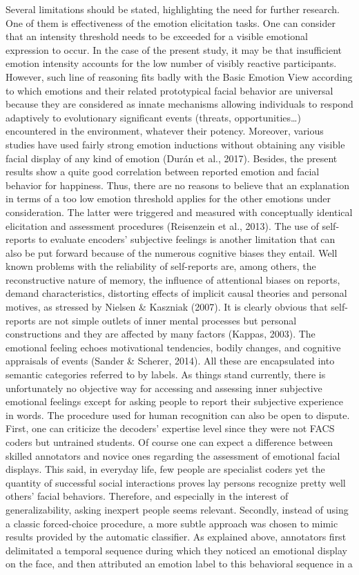 \documentclass[man]{apa6}
\begin{document}
Several limitations should be stated, highlighting the need for further research. One of them is effectiveness of the emotion elicitation tasks. One can consider that an intensity threshold needs to be exceeded for a visible emotional expression to occur. In the case of the present study, it may be that insufficient emotion intensity accounts for the low number of visibly reactive participants. However, such line of reasoning fits badly with the Basic Emotion View according to which emotions and their related prototypical facial behavior are universal because they are considered as innate mechanisms allowing individuals to respond adaptively to evolutionary significant events (threats, opportunities\ldots{}) encountered in the environment, whatever their potency. Moreover, various studies have used fairly strong emotion inductions without obtaining any visible facial display of any kind of emotion (Durán et al., 2017). Besides, the present results show a quite good correlation between reported emotion and facial behavior for happiness. Thus, there are no reasons to believe that an explanation in terms of a too low emotion threshold applies for the other emotions under consideration. The latter were triggered and measured with conceptually identical elicitation and assessment procedures (Reisenzein et al., 2013). The use of self-reports to evaluate encoders' subjective feelings is another limitation that can also be put forward because of the numerous cognitive biases they entail. Well known problems with the reliability of self-reports are, among others, the reconstructive nature of memory, the influence of attentional biases on reports, demand characteristics, distorting effects of implicit causal theories and personal motives, as stressed by Nielsen \& Kaszniak (2007). It is clearly obvious that self-reports are not simple outlets of inner mental processes but personal constructions and they are affected by many factors (Kappas, 2003). The emotional feeling echoes motivational tendencies, bodily changes, and cognitive appraisals of events (Sander \& Scherer, 2014). All these are encapsulated into semantic categories referred to by labels. As things stand currently, there is unfortunately no objective way for accessing and assessing inner subjective emotional feelings except for asking people to report their subjective experience in words. The procedure used for human recognition can also be open to dispute. First, one can criticize the decoders' expertise level since they were not FACS coders but untrained students. Of course one can expect a difference between skilled annotators and novice ones regarding the assessment of emotional facial displays. This said, in everyday life, few people are specialist coders yet the quantity of successful social interactions proves lay persons recognize pretty well others' facial behaviors. Therefore, and especially in the interest of generalizability, asking inexpert people seems relevant. Secondly, instead of using a classic forced-choice procedure, a more subtle approach was chosen to mimic results provided by the automatic classifier. As explained above, annotators first delimitated a temporal sequence during which they noticed an emotional display on the face, and then attributed an emotion label to this behavioral sequence in a 
\end{document}
